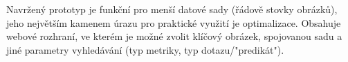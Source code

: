 \documentclass[12pt]{article}
\begin{document}
Navržený prototyp je funkční pro menší datové sady (řádově stovky obrázků), jeho největším kamenem úrazu pro praktické využití je optimalizace.
Obsahuje webové rozhraní, ve kterém je možné zvolit klíčový obrázek, spojovanou sadu a jiné parametry vyhledávání (typ metriky, typ dotazu/"predikát").




\end{document}
